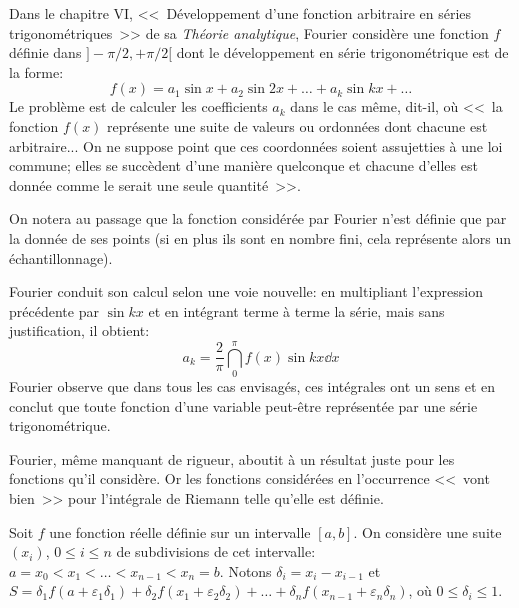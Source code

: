 \medskip
\begin{histoire}%
Dans le chapitre VI, <<~Développement d'une fonction arbitraire en séries
trigonométriques~>> de sa \emph{Théorie analytique}, Fourier
considère une fonction $f$
définie dans $]-\pi/2,+\pi/2[$ dont le développement en série trigonométrique est
de la forme:
\begin{equation} f(x)=a_1\sin x+a_2\sin 2x +\ldots+a_k\sin kx +\ldots\end{equation}
Le problème est de calculer les coefficients $a_k$ dans le cas même, dit-il, où <<~la
fonction $f(x)$ représente une suite de valeurs ou ordonnées dont chacune est
arbitraire... On ne suppose point que ces coordonnées soient assujetties à une
loi commune; elles se succèdent d'une manière quelconque et chacune d'elles
est donnée comme le serait une seule quantité~>>.

On notera au passage que la fonction considérée par Fourier
n'est définie que par la donnée de ses points (si en plus ils sont en nombre fini, cela représente alors
un échantillonnage).

\medskip
Fourier
conduit son calcul selon une voie nouvelle: en multipliant l'expression précédente
par $\sin kx$ et en intégrant terme à terme la série, mais sans justification, il obtient:
\begin{equation}a_k=\frac2{\pi}\dint_0^{\pi} f(x)\sin kx \dd x\end{equation}
Fourier
observe que dans tous les cas envisagés, ces intégrales ont un sens et en conclut
que toute fonction d'une variable peut-être représentée par une série trigonométrique.

Fourier,
même manquant de rigueur, aboutit à un résultat juste pour les fonctions
qu'il considère.
Or les fonctions considérées en l'occurrence <<~vont bien~>> pour l'intégrale de Riemann
telle qu'elle est définie.

\medskip
{}
\begin{definition}
Soit $f$ une fonction réelle définie sur un intervalle $[a,b]$.
On considère une suite $(x_i)$, $0\le i\le n$ de subdivisions de cet intervalle:
$a=x_0 < x_1 <\ldots < x_{n-1} <x_n=b$.
Notons $\delta_i=x_i-x_{i-1}$ et $S=\delta_1f(a+\varepsilon_1\delta_1) +
\delta_2 f(x_1+\varepsilon_2\delta_2)+ \ldots + \delta_nf(x_{n-1}+\varepsilon_n\delta_n)$,
où $0\le \delta_i\le 1$.


\end{definition}
\end{histoire}
